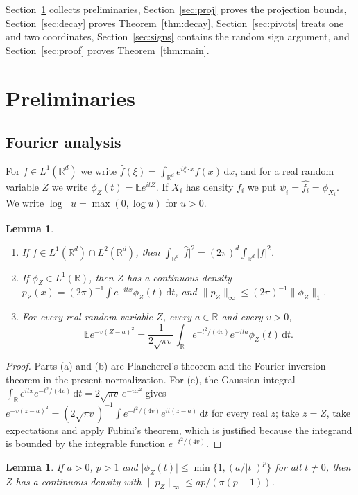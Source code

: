\documentclass[11pt]{amsart}
\numberwithin{equation}{section}
\newtheorem{lemma}[theorem]{Lemma}
\theoremstyle{definition}
\theoremstyle{remark}
\newcommand{\R}{\mathbb R}
\newcommand{\E}{\mathbb E}
\newcommand{\1}{\mathbf 1}
\newcommand{\dd}{\,\mathrm d}
\newcommand{\logp}{\log_+}
\newcommand{\norm}[1]{\lVert #1\rVert}
\newcommand{\abs}[1]{\lvert #1\rvert}
\begin{document}
Section~\ref{sec:prelim} collects preliminaries, Section~\ref{sec:proj} proves the projection bounds, Section~\ref{sec:decay} proves Theorem~\ref{thm:decay}, Section~\ref{sec:pivots} treats one and two coordinates, Section~\ref{sec:signs} contains the random sign argument, and Section~\ref{sec:proof} proves Theorem~\ref{thm:main}.

\section{Preliminaries}\label{sec:prelim}

\subsection{Fourier analysis}
For $f\in L^1(\R^d)$ we write $\widehat f(\xi)=\int_{\R^d}e^{i\xi\cdot x}f(x)\dd x$, and for a real random variable $Z$ we write $\phi_Z(t)=\E e^{itZ}$. If $X_i$ has density $f_i$ we put $\psi_i=\widehat{f_i}=\phi_{X_i}$. We write $\logp u=\max(0,\log u)$ for $u>0$.

\begin{lemma}\label{lem:fourier}
\begin{enumerate}
\item[(a)] If $f\in L^1(\R^d)\cap L^2(\R^d)$, then $\int_{\R^d}\abs{\widehat f}^2=(2\pi)^d\int_{\R^d}\abs f^2$.
\item[(b)] If $\phi_Z\in L^1(\R)$, then $Z$ has a continuous density $p_Z(x)=(2\pi)^{-1}\int e^{-itx}\phi_Z(t)\dd t$, and $\norm{p_Z}_\infty\le(2\pi)^{-1}\norm{\phi_Z}_1$.
\item[(c)] For every real random variable $Z$, every $a\in\R$ and every $v>0$,
\[
\E e^{-v(Z-a)^2}=\frac1{2\sqrt{\pi v}}\int_\R e^{-t^2/(4v)}e^{-ita}\phi_Z(t)\dd t.
\]
\end{enumerate}
\end{lemma}

\begin{proof}
Parts (a) and (b) are Plancherel's theorem and the Fourier inversion theorem in the present normalization. For (c), the Gaussian integral $\int_\R e^{itx}e^{-t^2/(4v)}\dd t=2\sqrt{\pi v}\,e^{-vx^2}$ gives $e^{-v(z-a)^2}=(2\sqrt{\pi v})^{-1}\int e^{-t^2/(4v)}e^{it(z-a)}\dd t$ for every real $z$; take $z=Z$, take expectations and apply Fubini's theorem, which is justified because the integrand is bounded by the integrable function $e^{-t^2/(4v)}$.
\end{proof}

\begin{lemma}\label{lem:envelope}
If $a>0$, $p>1$ and $\abs{\phi_Z(t)}\le\min\{1,(a/\abs t)^p\}$ for all $t\ne0$, then $Z$ has a continuous density with $\norm{p_Z}_\infty\le ap/(\pi(p-1))$.
\end{lemma}
\end{document}
